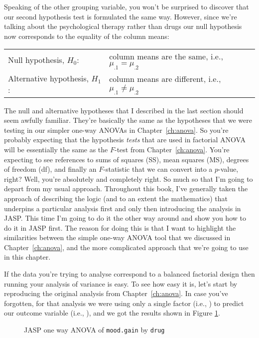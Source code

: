 Speaking of the other grouping variable, you won't be surprised to discover that our second hypothesis test is formulated the same way. However, since we're talking about the psychological therapy rather than drugs our null hypothesis now corresponds to the equality of the column means:
\begin{center}
\begin{tabular}{ll}
Null hypothesis, $H_0$: & column means are the same, i.e., $\mu_{.1} = \mu_{.2}$ \\
Alternative hypothesis, $H_1$: & column means are different, i.e., $\mu_{.1} \neq \mu_{.2}$
\end{tabular}
\end{center}


The null and alternative hypotheses that I described in the last section should seem awfully familiar. They're basically the same as the hypotheses that we were testing in our simpler one-way ANOVAs in Chapter~\ref{ch:anova}. So you're probably expecting that the hypothesis {\it tests} that are used in factorial ANOVA will be essentially the same as the $F$-test from Chapter~\ref{ch:anova}. You're expecting to see references to sums of squares (SS), mean squares (MS), degrees of freedom (df), and finally an $F$-statistic that we can convert into a $p$-value, right? Well, you're absolutely and completely right. So much so that I'm going to depart from my usual approach. Throughout this book, I've generally taken the approach of describing the logic (and to an extent the mathematics) that underpins a particular analysis first and only then introducing the analysis in JASP. This time I'm going to do it the other way around and show you how to do it in JASP first. The reason for doing this is that I want to highlight the similarities between the simple one-way ANOVA tool that we discussed in Chapter~\ref{ch:anova}, and the more complicated approach that we're going to use in this chapter. 

If the data you're trying to analyse correspond to a balanced factorial design then running your analysis of variance is easy. To see how easy it is, let's start by reproducing the original analysis from Chapter~\ref{ch:anova}. In case you've forgotten, for that analysis we were using only a single factor (i.e., ) to predict our outcome variable (i.e., ), and we got the results shown in Figure \ref{fig:factorialanova2}.

\begin{figure}[!htb]
\begin{center}
\caption{JASP one way ANOVA of \texttt{mood.gain} by \texttt{drug}}
\label{fig:factorialanova2}
\HR
\end{center}
\end{figure}

